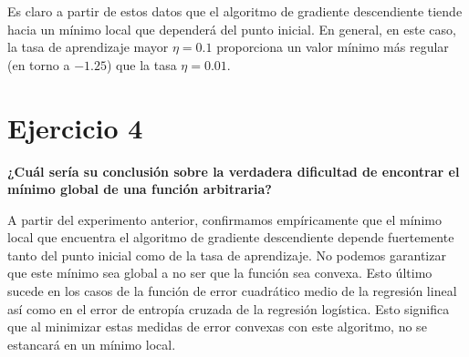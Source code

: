 Es claro a partir de estos datos que el algoritmo de gradiente descendiente tiende
hacia un mínimo local que dependerá del punto inicial. En general, en este caso,
la tasa de aprendizaje mayor $\eta=0.1$ proporciona un valor mínimo más regular
(en torno a $-1.25$) que la tasa $\eta=0.01$. 

\section{Ejercicio 4}

\textbf{¿Cuál sería su conclusión sobre la verdadera dificultad de encontrar el mínimo
global de una función arbitraria?}

A partir del experimento anterior, confirmamos empíricamente que el mínimo local
que encuentra el algoritmo de gradiente descendiente depende fuertemente tanto
del punto inicial como de la tasa de aprendizaje. No podemos garantizar que este
mínimo sea global a no ser que la función sea convexa. Esto último sucede en los casos
de la función de error cuadrático medio de la regresión lineal así como en el 
error de entropía cruzada de la regresión logística. 
Esto significa que al minimizar estas medidas de error convexas con este
algoritmo, no se estancará en un mínimo local.